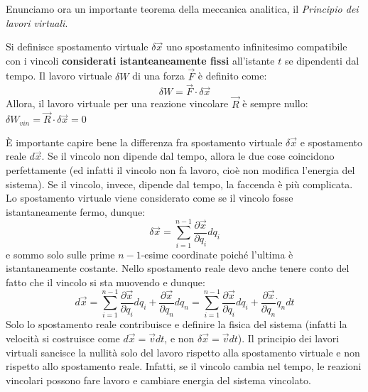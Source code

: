 \documentclass[a4paper,openany]{article}
\begin{document}
	
	
	Enunciamo ora un importante teorema della meccanica analitica, il \textit{Principio dei lavori virtuali}. 
	\begin{tcolorbox}
		Si definisce spostamento virtuale $\delta \vec{x}$ uno spostamento infinitesimo compatibile con i vincoli \textbf{considerati istanteaneamente fissi} all'istante $t$ se dipendenti dal tempo. Il lavoro virtuale $\delta W$ di una forza $\vec{F}$ è definito come:
		$$
		\delta W = \vec{F} \cdot \delta\vec{x}
		$$
		Allora, il lavoro virtuale per una reazione vincolare $\vec{R}$ è sempre nullo: $\delta W_{vin} = \vec{R}\cdot\delta\vec{x}=0$ 
	\end{tcolorbox}
	È importante capire bene la differenza fra spostamento virtuale $\delta \vec{x}$ e spostamento reale $d\vec{x}$. Se il vincolo non dipende dal tempo, allora le due cose coincidono perfettamente (ed infatti il vincolo non fa lavoro, cioè non modifica l'energia del sistema). Se il vincolo, invece, dipende dal tempo, la faccenda è più complicata. Lo spostamento virtuale viene considerato come se il vincolo fosse istantaneamente fermo, dunque:
	$$
	\delta \vec{x} =\sum_{i=1}^{n-1} \dfrac{\partial \vec{x}}{\partial q_{i}}dq_{i}
	$$
	e sommo solo sulle prime $n-1$-esime coordinate poiché l'ultima è istantaneamente costante.
	Nello spostamento reale devo anche tenere conto del fatto che il vincolo si sta muovendo e dunque:
	$$
	d\vec{x} = \sum_{i=1}^{n-1} \dfrac{\partial \vec{x}}{\partial q_{i}}dq_{i} + \dfrac{\partial \vec{x}}{\partial q_{n}}dq_{n} = \sum_{i=1}^{n-1} \dfrac{\partial \vec{x}}{\partial q_{i}}dq_{i} + \dfrac{\partial \vec{x}}{\partial q_{n}}\dot{q}_ndt
	$$
	Solo lo spostamento reale contribuisce e definire la fisica del sistema (infatti la velocità si costruisce come $d\vec{x} = \vec{v}dt$, e non $\delta \vec{x} = \vec{v}dt$). Il principio dei lavori virtuali sancisce la nullità solo del lavoro rispetto alla spostamento virtuale e non rispetto allo spostamento reale. Infatti, se il vincolo cambia nel tempo, le reazioni vincolari possono fare lavoro e cambiare energia del sistema vincolato.
	
\end{document}
